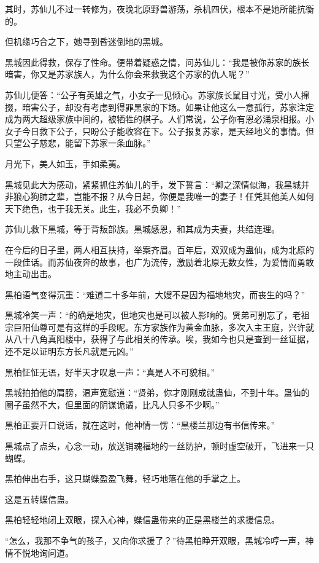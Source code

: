 \begin{this_body}
其时，苏仙儿不过一转修为，夜晚北原野兽游荡，杀机四伏，根本不是她所能抗衡的。

但机缘巧合之下，她寻到昏迷倒地的黑城。

黑城因此得救，保存了性命。便带着疑惑之情，问苏仙儿：“我是被你苏家的族长暗害，你又是苏家族人，为什么你会来救我这个苏家的仇人呢？”

苏仙儿便答：“公子有英雄之气，小女子一见倾心。苏家族长鼠目寸光，受小人撺掇，暗害公子，却没有考虑到得罪黑家的下场。如果让他这么一意孤行，苏家注定成为两大超级家族中间的，被牺牲的棋子。人们常说，公子你有恩必涌泉相报。小女子今日救下公子，只盼公子能收容在下。公子报复苏家，是天经地义的事情。但只望公子慈悲，能留下苏家一条血脉。”

月光下，美人如玉，手如柔荑。

黑城见此大为感动，紧紧抓住苏仙儿的手，发下誓言：“卿之深情似海，我黑城并非狼心狗肺之辈，岂能不报？从今日起，你便是我唯一的妻子！任凭其他美人如何天下绝色，也于我无关。此生，我必不负卿！”

苏仙儿救下黑城，等于背叛部族。黑城感恩，和其成为夫妻，共结连理。

在今后的日子里，两人相互扶持，举案齐眉。百年后，双双成为蛊仙，成为北原的一段佳话。而苏仙夜奔的故事，也广为流传，激励着北原无数女性，为爱情而勇敢地主动出击。

黑柏语气变得沉重：“难道二十多年前，大嫂不是因为福地地灾，而丧生的吗？”

黑城冷笑一声：“的确是地灾，但地灾也是可以被人影响的。贤弟可别忘了，老祖宗巨阳仙尊可是有这样的手段呢。东方家族作为黄金血脉，多次入主王庭，兴许就从八十八角真阳楼中，获得了与此相关的传承。唉，我如今也只是查到一丝证据，还不足以证明东方长凡就是元凶。”

黑柏怔怔无语，好半天才叹息一声：“真是人不可貌相。”

黑城拍拍他的肩膀，温声宽慰道：“贤弟，你才刚刚成就蛊仙，不到十年。蛊仙的圈子虽然不大，但里面的阴谋诡谲，比凡人只多不少啊。”

黑柏正要开口说话，就在这时，他神情一愣：“黑楼兰那边有书信传来。”

黑城点了点头，心念一动，放送销魂福地的一丝防护，顿时虚空破开，飞进来一只蝴蝶。

黑柏伸出右手，这只蝴蝶盈盈飞舞，轻巧地落在他的手掌之上。

这是五转蝶信蛊。

黑柏轻轻地闭上双眼，探入心神，蝶信蛊带来的正是黑楼兰的求援信息。

“怎么，我那不争气的孩子，又向你求援了？”待黑柏睁开双眼，黑城冷哼一声，神情不悦地询问道。


\end{this_body}
